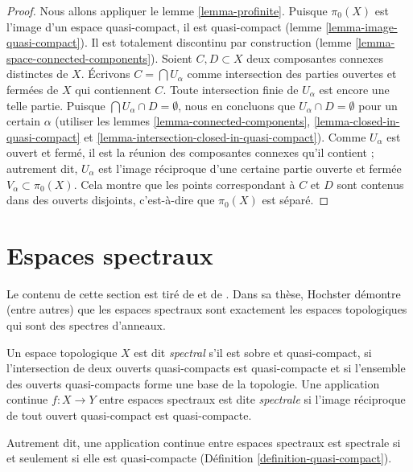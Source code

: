 \begin{proof}
Nous allons appliquer le lemme \ref{lemma-profinite}.
Puisque $\pi_0(X)$ est l'image d'un espace quasi-compact, il est quasi-compact
(lemme \ref{lemma-image-quasi-compact}).
Il est totalement discontinu par construction
(lemme \ref{lemma-space-connected-components}).
Soient $C, D \subset X$ deux composantes connexes distinctes de $X$.
Écrivons $C = \bigcap U_\alpha$ comme intersection des parties ouvertes et
fermées de $X$ qui contiennent $C$. Toute intersection finie de $U_\alpha$
est encore une telle partie. Puisque $\bigcap U_\alpha \cap D = \emptyset$,
nous en concluons que $U_\alpha \cap D = \emptyset$ pour un certain $\alpha$
(utiliser les lemmes \ref{lemma-connected-components},
\ref{lemma-closed-in-quasi-compact} et
\ref{lemma-intersection-closed-in-quasi-compact}).
Comme $U_\alpha$ est ouvert et fermé, il est la réunion des composantes
connexes qu'il contient ; autrement dit, $U_\alpha$ est l'image réciproque
d'une certaine partie ouverte et fermée $V_\alpha \subset \pi_0(X)$.
Cela montre que les points correspondant à $C$ et $D$ sont contenus dans des
ouverts disjoints, c'est-à-dire que $\pi_0(X)$ est séparé.
\end{proof}





\section{Espaces spectraux}
\label{section-spectral}

\noindent
Le contenu de cette section est tiré de \cite{Hochster} et de
\cite{Hochster-thesis}. Dans sa thèse, Hochster démontre (entre autres)
que les espaces spectraux sont exactement les espaces topologiques qui
sont des spectres d'anneaux.

\begin{definition}
\label{definition-spectral-space}
Un espace topologique $X$ est dit {\it spectral} s'il est sobre et
quasi-compact, si l'intersection de deux ouverts quasi-compacts est
quasi-compacte et si l'ensemble des ouverts quasi-compacts forme une
base de la topologie. Une application continue $f : X \to Y$ entre espaces
spectraux est dite {\it spectrale} si l'image réciproque de tout ouvert
quasi-compact est quasi-compacte.
\end{definition}

\noindent
Autrement dit, une application continue entre espaces spectraux est spectrale
si et seulement si elle est quasi-compacte (Définition
\ref{definition-quasi-compact}).

